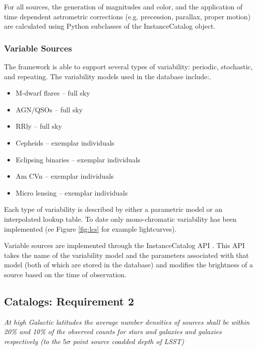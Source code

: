 \documentclass[]{article}
\begin{document}
{For all sources, the generation of magnitudes and color, and the
application of time dependent astrometric corrections (e.g.
precession, parallax, proper motion) are calculated using Python
subclasses of the InstanceCatalog object.

\subsubsection{Variable Sources}
The framework is able to support several types of variability:
periodic, stochastic, and repeating.
The variability models used in the database include:.  
\begin{itemize}
\item M-dwarf flares -- full sky
\item AGN/QSOs -- full sky
\item RRly -- full sky
\item Cepheids -- exemplar individuals
\item Eclipsing binaries -- exemplar individuals
\item Am CVn -- exemplar individuals
\item Micro lensing -- exemplar individuals
\end{itemize}
Each type of variability is described by either a parametric model or
an interpolated lookup table.  To date only mono-chromatic variability
has been implemented (ee Figure \ref{fig:lcs} for example lightcurves).

Variable sources are implemented through the InstanceCatalog API
\citep{XXX}. This API takes the name of the variability model and the
parameters associated with that model (both of which are stored in the
database) and modifies the brightness of a source based on the time of
observation.

\subsection{Catalogs: Requirement 2}

{\it At high Galactic latitudes the average number densities of
  sources shall be within 20\% and 10\% of the observed counts for
  stars and galaxies and galaxies respectively (to the $5\sigma$ point
  source coadded depth of LSST)} 


}
\end{document}
